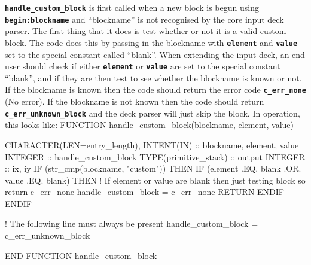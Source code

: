 \documentclass[12pt,a4paper]{article}
\newcommand{\inlinecode}[1]{{\color{warwickred} \bf\texttt{#1}}}
\newenvironment{boxverbatim}{\lboxverbatim{none}}{\endlboxverbatim}
\begin{document}
\inlinecode{handle\_custom\_block} is first called when a new block is begun
using \inlinecode{begin:blockname} and ``blockname'' is not recognised by the
core input deck parser. The first thing that it does is test whether or not it
is a valid custom block. The code does this by passing in the blockname with
\inlinecode{element} and \inlinecode{value} set to the special constant called
``blank''. When extending the input deck, an end user should check if either
\inlinecode{element} or \inlinecode{value} are set to the special constant
``blank'', and if they are then test to see whether the blockname is known or
not. If the blockname is known then the code should return the error code
\inlinecode{c\_err\_none} (No error). If the blockname is not known then the
code should return \inlinecode{c\_err\_unknown\_block} and the deck parser will
just skip the block. In operation, this looks like:
\begin{boxverbatim}
FUNCTION handle_custom_block(blockname, element, value)

  CHARACTER(LEN=entry_length), INTENT(IN) :: blockname, element, value
  INTEGER :: handle_custom_block
  TYPE(primitive_stack) :: output
  INTEGER :: ix, iy
  IF (str_cmp(blockname, "custom")) THEN
    IF (element .EQ. blank .OR. value .EQ. blank) THEN
       ! If element or value are blank then just testing block so return c_err_none
       handle_custom_block = c_err_none
       RETURN
     ENDIF
   ENDIF

  ! The following line must always be present
  handle_custom_block = c_err_unknown_block

END FUNCTION handle_custom_block
\end{boxverbatim}
\end{document}
